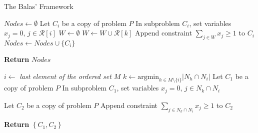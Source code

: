 \documentclass[a4paper,12pt]{mydeitesi_eng}
\begin{document}
\begin{chapter}{The Balas' Framework}
\begin{algorithm}[h]
\BlankLine

$Nodes \gets \emptyset$\;
{
	Let $C_i$ be a copy of problem $P$\;
	In subproblem $C_i$, set variables $x_j = 0, \, j \in \mathcal{R}[i]$\;
	{
		$W \gets \emptyset$\;
		{
			$W \gets W \cup \mathcal{R}[k]$\;
		}
		Append constraint $\sum_{j\in W} x_j \geq 1$ to $C_i$\;
	}
	$Nodes \gets Nodes \cup \{C_i\}$\;
}

\textbf{Return } $Nodes$\;


\BlankLine
\BlankLine

\caption{\emph{Balas Branch Rule 1} (BR1) procedure.}
\label{alg:BalasBranchRule1}
\end{algorithm}

\begin{algorithm}[h]
\AlgoDontDisplayBlockMarkers
\SetAlgoNoEnd
\DontPrintSemicolon
\LinesNumbered


\BlankLine

$i \gets $ \emph{last element of the ordered set $M$}\;
$k \gets \text{argmin}_{h \in M \setminus \{i\}} \left| N_h \cap N_i \right|$\;
\BlankLine
Let $C_1$ be a copy of problem $P$\;
In subproblem $C_1$, set variables $x_j = 0, \, j \in N_k \cap N_i$\;

\BlankLine
Let $C_2$ be a copy of problem $P$\;
Append constraint $\sum_{j\in N_k \cap N_i} x_j \geq 1$ to $C_2$\;

\BlankLine
\textbf{Return } $\left\{ C_1, C_2 \right\}$\;

\BlankLine
\BlankLine

\caption{\emph{Balas Branch Rule 2} (BR2) procedure.}
\label{alg:BalasBranchRule2}
\end{algorithm}

\begin{algorithm}[h]
\AlgoDontDisplayBlockMarkers
\SetAlgoNoEnd
\DontPrintSemicolon
\LinesNumbered


\end{algorithm}
\end{chapter}
\end{document}
